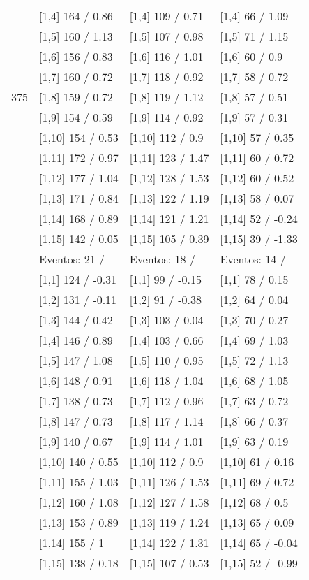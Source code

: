 \begin{table}
\begin{tabular}[t]{llll}
 & {}[1,4] 164  / 0.86 & {}[1,4] 109  / 0.71 & {}[1,4] 66  / 1.09\\
 & {}[1,5] 160  / 1.13 & {}[1,5] 107  / 0.98 & {}[1,5] 71  / 1.15\\
 & {}[1,6] 156  / 0.83 & {}[1,6] 116  / 1.01 & {}[1,6] 60  / 0.9\\
 & {}[1,7] 160  / 0.72 & {}[1,7] 118  / 0.92 & {}[1,7] 58  / 0.72\\
375 & {}[1,8] 159  / 0.72 & {}[1,8] 119  / 1.12 & {}[1,8] 57  / 0.51\\
\addlinespace
 & {}[1,9] 154  / 0.59 & {}[1,9] 114  / 0.92 & {}[1,9] 57  / 0.31\\
 & {}[1,10] 154  / 0.53 & {}[1,10] 112  / 0.9 & {}[1,10] 57  / 0.35\\
 & {}[1,11] 172  / 0.97 & {}[1,11] 123  / 1.47 & {}[1,11] 60  / 0.72\\
 & {}[1,12] 177  / 1.04 & {}[1,12] 128  / 1.53 & {}[1,12] 60  / 0.52\\
 & {}[1,13] 171  / 0.84 & {}[1,13] 122  / 1.19 & {}[1,13] 58  / 0.07\\
\addlinespace
 & {}[1,14] 168  / 0.89 & {}[1,14] 121  / 1.21 & {}[1,14] 52  / -0.24\\
 & {}[1,15] 142  / 0.05 & {}[1,15] 105  / 0.39 & {}[1,15] 39  / -1.33\\
 & Eventos:  21 / & Eventos:  18 / & Eventos:  14 /\\
 & {}[1,1] 124  / -0.31 & {}[1,1] 99  / -0.15 & {}[1,1] 78  / 0.15\\
 & {}[1,2] 131  / -0.11 & {}[1,2] 91  / -0.38 & {}[1,2] 64  / 0.04\\
\addlinespace
 & {}[1,3] 144  / 0.42 & {}[1,3] 103  / 0.04 & {}[1,3] 70  / 0.27\\
 & {}[1,4] 146  / 0.89 & {}[1,4] 103  / 0.66 & {}[1,4] 69  / 1.03\\
 & {}[1,5] 147  / 1.08 & {}[1,5] 110  / 0.95 & {}[1,5] 72  / 1.13\\
 & {}[1,6] 148  / 0.91 & {}[1,6] 118  / 1.04 & {}[1,6] 68  / 1.05\\
 & {}[1,7] 138  / 0.73 & {}[1,7] 112  / 0.96 & {}[1,7] 63  / 0.72\\
\addlinespace
500 & {}[1,8] 147  / 0.73 & {}[1,8] 117  / 1.14 & {}[1,8] 66  / 0.37\\
 & {}[1,9] 140  / 0.67 & {}[1,9] 114  / 1.01 & {}[1,9] 63  / 0.19\\
 & {}[1,10] 140  / 0.55 & {}[1,10] 112  / 0.9 & {}[1,10] 61  / 0.16\\
 & {}[1,11] 155  / 1.03 & {}[1,11] 126  / 1.53 & {}[1,11] 69  / 0.72\\
 & {}[1,12] 160  / 1.08 & {}[1,12] 127  / 1.58 & {}[1,12] 68  / 0.5\\
\addlinespace
 & {}[1,13] 153  / 0.89 & {}[1,13] 119  / 1.24 & {}[1,13] 65  / 0.09\\
 & {}[1,14] 155  / 1 & {}[1,14] 122  / 1.31 & {}[1,14] 65  / -0.04\\
 & {}[1,15] 138  / 0.18 & {}[1,15] 107  / 0.53 & {}[1,15] 52  / -0.99\\
\bottomrule
\end{tabular}
\end{table}
